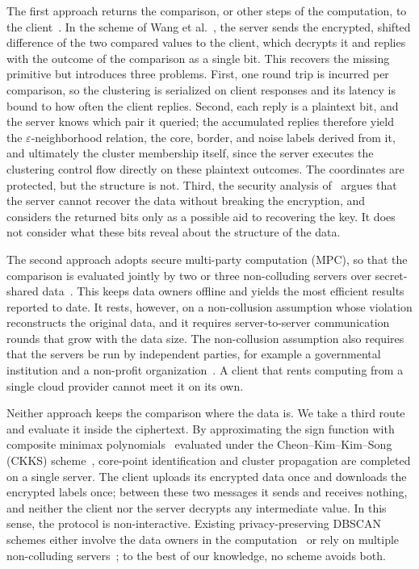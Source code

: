 The first approach returns the comparison, or other steps of the
computation, to the client~\cite{wang2022homomorphic,rahman2017towards}.
In the scheme of Wang et al.~\cite{wang2022homomorphic}, the server sends
the encrypted, shifted difference of the two compared values to the
client, which decrypts it and replies with the outcome of the comparison
as a single bit. This
recovers the missing primitive but introduces three problems. First, one
round trip is incurred per comparison, so the clustering is serialized on
client responses and its latency is bound to how often the client
replies. Second, each reply is a plaintext
bit, and the server knows which pair it queried; the accumulated replies
therefore yield the $\varepsilon$-neighborhood relation, the core, border,
and noise labels derived from it, and ultimately the cluster membership
itself, since the server executes the clustering control flow directly on
these plaintext outcomes. The coordinates are protected, but the structure
is not. Third, the security analysis of~\cite{wang2022homomorphic} argues
that the server cannot recover the data without breaking the encryption,
and considers the returned bits only as a possible aid to recovering the
key. It does not consider what these bits reveal about the structure of
the data.

The second approach adopts secure multi-party computation (MPC), so that
the comparison is evaluated jointly by two or three non-colluding servers
over secret-shared data~\cite{bozdemir2021privacy,fu2024ppa,fu2024fss}.
This keeps data owners offline and yields the most efficient results
reported to date. It rests, however, on a non-collusion assumption whose
violation reconstructs the original data, and it requires
server-to-server communication rounds that grow with the data size. The
non-collusion assumption also requires that the servers be run by
independent parties, for example a governmental institution and a
non-profit organization~\cite{bozdemir2021privacy}. A client that rents
computing from a single cloud provider cannot meet it on its own.

Neither approach keeps the comparison where the data is. We take a third
route and evaluate it inside the ciphertext. By approximating the sign
function with composite minimax polynomials~\cite{lee2021minimax}
evaluated under the Cheon--Kim--Kim--Song (CKKS)
scheme~\cite{cheon2017homomorphic}, core-point identification
and cluster propagation are completed on a single server. The client
uploads its encrypted data once and downloads the encrypted labels once;
between these two messages it sends and receives nothing, and neither the
client nor the server decrypts any intermediate value. In this sense, the
protocol is non-interactive. Existing privacy-preserving DBSCAN schemes
either involve the data owners in the
computation~\cite{amirbekyan2006privacy,kumar2007privacy,liu2012privacy,rahman2017towards,wang2022homomorphic}
or rely on multiple non-colluding
servers~\cite{bozdemir2021privacy,fu2024ppa,fu2024fss}; to the best of our
knowledge, no scheme avoids both.

